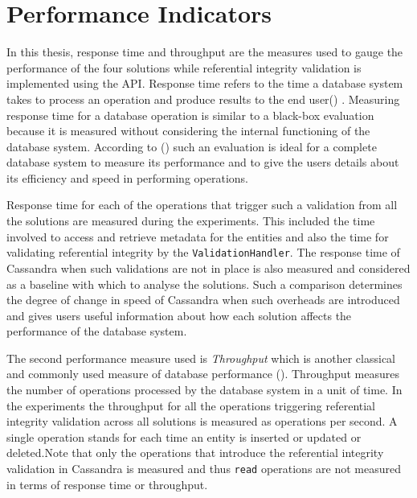 \section{Performance Indicators} \label{sexp:PerformanceIndicators}

In this thesis, response time and throughput are the measures used to gauge the
performance of the four solutions while referential integrity validation is
implemented using the \ac{API}.
Response time refers to the time  a database system takes to process an
operation and produce results to the end user() . Measuring response time for a
database operation is similar to a black-box evaluation because it is measured 
without considering the internal functioning  of the database system. According
to () such an evaluation is ideal for a complete database
system to measure its performance and to give the users details about its 
efficiency and speed in performing operations. 

Response time for each of the  operations that trigger such a validation from
all the solutions are measured during the experiments.
This included the time involved to access and retrieve metadata for the entities
and also the time for validating referential integrity by the
\texttt{ValidationHandler}. The response time of Cassandra when such validations
are not in place is also measured and considered as a baseline with which to
analyse the solutions. Such a comparison determines the degree of change in
speed of Cassandra when such overheads are introduced and gives users useful
information about how each solution affects the performance of the database
system.

The second performance measure used is \textit{Throughput} which is another
classical and commonly used measure of database performance (). Throughput measures the number of operations processed by the
database system in a unit of time. In the experiments the throughput for all the
operations triggering referential integrity validation across all solutions is
measured as operations per second. A single operation stands for each time an
entity is inserted or updated or deleted.Note that only the operations that
introduce the referential integrity validation in Cassandra is measured and thus
\texttt{read} operations are not measured in terms of response time or
throughput.

